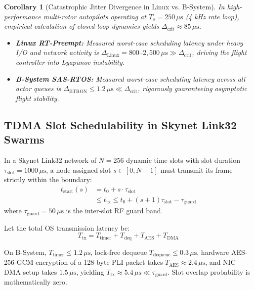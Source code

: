 \documentclass[10pt,journal,compsoc,twocolumn]{article}
\newtheorem{corollary}{Corollary}
\begin{document}
\begin{corollary}[Catastrophic Jitter Divergence in Linux vs. B-System]
In high-performance multi-rotor autopilots operating at $T_s = 250\,\mu\text{s}$ (4 kHz rate loop), empirical calculation of closed-loop dynamics yields $\Delta_{\text{crit}} \approx 85\,\mu\text{s}$.
\begin{itemize}[leftmargin=*]
    \item \textbf{Linux RT-Preempt:} Measured worst-case scheduling latency under heavy I/O and network activity is $\Delta_{\text{Linux}} = 800\text{--}2{,}500\,\mu\text{s} \gg \Delta_{\text{crit}}$, driving the flight controller into Lyapunov instability.
    \item \textbf{B-System SAS-RTOS:} Measured worst-case scheduling latency across all actor queues is $\Delta_{\text{BTRON}} \le 1.2\,\mu\text{s} \ll \Delta_{\text{crit}}$, rigorously guaranteeing asymptotic flight stability.
\end{itemize}
\end{corollary}

\subsection{TDMA Slot Schedulability in Skynet Link32 Swarms}
In a Skynet Link32 network of $N = 256$ dynamic time slots with slot duration $\tau_{\text{slot}} = 1000\,\mu\text{s}$, a node assigned slot $s \in [0, N-1]$ must transmit its frame strictly within the boundary:
\begin{equation}
\begin{aligned}
t_{\text{start}}(s) &= t_0 + s \cdot \tau_{\text{slot}} \\
&\le t_{\text{tx}} \le t_0 + (s + 1)\tau_{\text{slot}} - \tau_{\text{guard}}
\end{aligned}
\end{equation}
where $\tau_{\text{guard}} = 50\,\mu\text{s}$ is the inter-slot RF guard band.

Let the total OS transmission latency be:
\begin{equation}
T_{\text{tx}} = T_{\text{timer}} + T_{\text{deq}} + T_{\text{AES}} + T_{\text{DMA}}
\end{equation}

On B-System, $T_{\text{timer}} \le 1.2\,\mu\text{s}$, lock-free dequeue $T_{\text{dequeue}} \le 0.3\,\mu\text{s}$, hardware AES-256-GCM encryption of a 128-byte PLI packet takes $T_{\text{AES}} \approx 2.4\,\mu\text{s}$, and NIC DMA setup takes $1.5\,\mu\text{s}$, yielding $T_{\text{tx}} \approx 5.4\,\mu\text{s} \ll \tau_{\text{guard}}$. Slot overlap probability is mathematically zero. 
\end{document}
